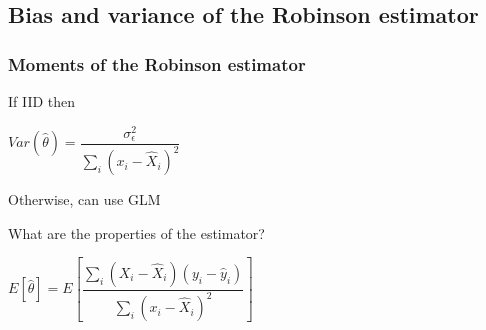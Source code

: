 
\subsection{Bias and variance of the Robinson estimator}

\subsubsection{Moments of the Robinson estimator}

If IID then

\(Var (\hat \theta) =\dfrac{\sigma^2_\epsilon }{\sum_i(x_i-\hat X_i)^2}\)

Otherwise, can use GLM

What are the properties of the estimator?

\(E[\hat \theta ]=E[\dfrac{\sum_i (X_i-\hat X_i)(y_i-\hat y_i)}{\sum_i(x_i-\hat X_i)^2}]\)

